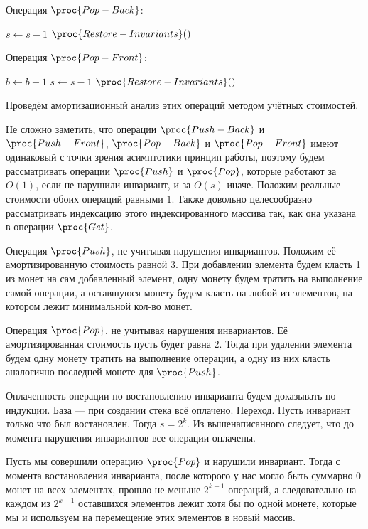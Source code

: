 \documentclass[11pt]{article}
\begin{document}
Операция $\proc{Pop-Back}$:
\begin{codebox}
\li	$s \gets s-1$
\li	$\proc{Restore-Invariants}()$
\end{codebox}
\hspace{1 mm}

Операция $\proc{Pop-Front}$:
\begin{codebox}
\li	$b \gets b+1$
\li	$s \gets s-1$
\li	$\proc{Restore-Invariants}()$
\end{codebox}
\hspace{1 mm}


Проведём амортизационный анализ этих операций методом учётных стоимостей. 

Не сложно заметить, что операции $\proc{Push-Back}$ и $\proc{Push-Front}$, $\proc{Pop-Back}$ и $\proc{Pop-Front}$ имеют одинаковый с точки зрения асимптотики принцип работы, поэтому будем рассматривать операции $\proc{Push}$ и $\proc{Pop}$, которые работают за $O(1)$, если не нарушили инвариант, и за $O(s)$ иначе. Положим реальные стоимости обоих операций равными $1$. Также довольно целесообразно рассматривать индексацию этого индексированного массива так, как она указана в операции $\proc{Get}$. 

Операция $\proc{Push}$, не учитывая нарушения инвариантов. Положим её амортизированную стоимость равной $3$. При добавлении элемента будем класть 1 из монет на сам добавленный элемент, одну монету будем тратить на выполнение самой операции, а оставшуюся монету будем класть на любой из элементов, на котором лежит минимальной кол-во монет.

Операция $\proc{Pop}$, не учитывая нарушения инвариантов. Её амортизированная стоимость пусть будет равна $2$. Тогда при удалении элемента будем одну монету тратить на выполнение операции, а одну из них класть аналогично последней монете для $\proc{Push}$.

Оплаченность операции по востановлению инварианта будем доказывать по индукции. База — при создании стека всё оплачено. Переход. Пусть инвариант только что был востановлен. Тогда $s=2^k$. Из вышенаписанного следует, что до момента нарушения инвариантов все операции оплачены. 

Пусть мы совершили операцию $\proc{Pop}$ и нарушили инвариант. Тогда с момента востановления инварианта, после которого у нас могло быть суммарно 0 монет на всех элементах, прошло не меньше $2^{k-1}$ операций, а следовательно на каждом из $2^{k-1}$ оставшихся элементов лежит хотя бы по одной монете, которые мы и используем на перемещение этих элементов в новый массив. 
\end{document}
